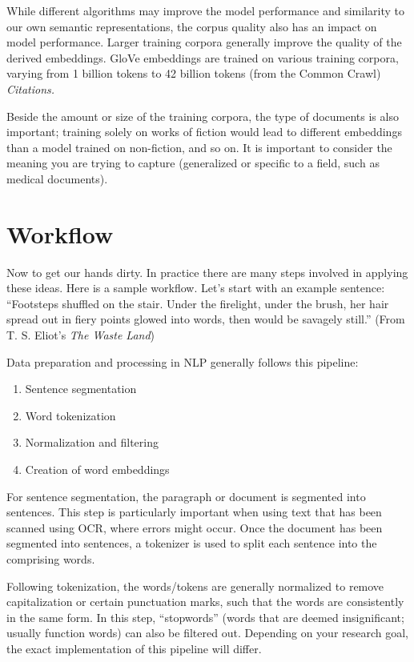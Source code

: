 While different algorithms may improve the model performance and similarity to our own semantic representations, the corpus quality also has an impact on model performance.
Larger training corpora generally improve the quality of the derived embeddings. 
GloVe embeddings are trained on various training corpora, varying from 1 billion tokens to 42 billion tokens (from the Common Crawl) \textit{Citations.}

Beside the amount or size of the training corpora, the type of documents is also important; training solely on works of fiction would lead to different embeddings than a model trained on non-fiction, and so on. It is important to consider the meaning you are trying to capture (generalized or specific to a field, such as medical documents).

\section{Workflow}

Now to get our hands dirty. In practice there are many steps involved in applying these ideas. 
Here is a sample workflow. Let's start with an example sentence: ``Footsteps shuffled on the stair. Under the firelight, under the brush, her hair spread out in fiery points glowed into words, then would be savagely still.'' (From T. S. Eliot's \textit{The Waste Land})

Data preparation and processing in NLP generally follows this pipeline: 

\begin{enumerate}
\item Sentence segmentation
\item Word tokenization
\item Normalization and filtering
\item Creation of word embeddings
\end{enumerate}

For sentence segmentation, the paragraph or document is segmented into sentences. This step is particularly important when using text that has been scanned using OCR, where errors might occur.
Once the document has been segmented into sentences, a tokenizer is used to split each sentence into the comprising words. 

Following tokenization, the words/tokens are generally normalized to remove capitalization or certain punctuation marks, such that the words are consistently in the same form.
In this step, ``stopwords'' (words that are deemed insignificant; usually function words) can also be filtered out.
Depending on your research goal, the exact implementation of this pipeline will differ.

